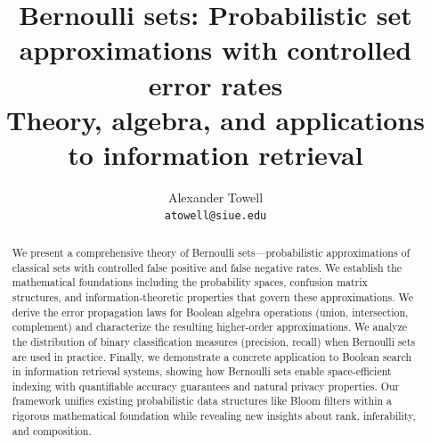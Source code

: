 \documentclass[10pt,final,hidelinks]{article}
\title
{
    Bernoulli sets: Probabilistic set approximations with controlled error rates\\
    \large Theory, algebra, and applications to information retrieval
}
\author
{
    Alexander Towell\\
    \texttt{atowell@siue.edu}
}
\date{}
\numberwithin{equation}{section}
\begin{document}
\maketitle
\begin{abstract}
We present a comprehensive theory of Bernoulli sets---probabilistic approximations of classical sets with controlled false positive and false negative rates.
We establish the mathematical foundations including the probability spaces, confusion matrix structures, and information-theoretic properties that govern these approximations.
We derive the error propagation laws for Boolean algebra operations (union, intersection, complement) and characterize the resulting higher-order approximations.
We analyze the distribution of binary classification measures (precision, recall) when Bernoulli sets are used in practice.
Finally, we demonstrate a concrete application to Boolean search in information retrieval systems, showing how Bernoulli sets enable space-efficient indexing with quantifiable accuracy guarantees and natural privacy properties.
Our framework unifies existing probabilistic data structures like Bloom filters within a rigorous mathematical foundation while revealing new insights about rank, inferability, and composition.
\end{abstract}

\tableofcontents

%



%













\end{document}
